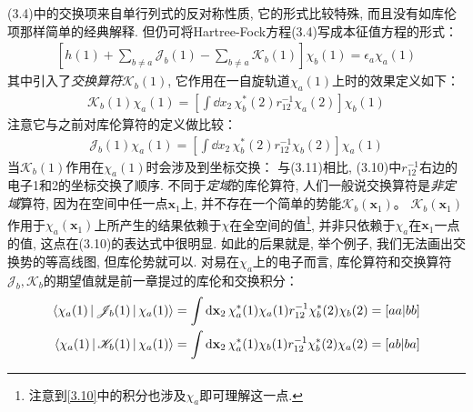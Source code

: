 (3.4)中的交换项来自单行列式的反对称性质, 它的形式比较特殊, 而且没有如库伦项那样简单的经典解释. 
但仍可将Hartree-Fock方程(3.4)写成本征值方程的形式：
\begin{align}
	\left[ h(1) + \sum_{b\neq a}\mathscr{J}_b(1) - \sum_{b\neq a}\mathscr{K}_b(1)   \right]\chi_b(1) = \epsilon_a\chi_a(1)
\end{align}
其中引入了\emph{交换算符}$\mathscr{K}_b(1)$, 
它作用在一自旋轨道$\chi_a(1)$上时的效果定义如下：
\begin{align}
	\label{3.10}
	\mathscr{K}_b(1)\chi_a(1) = \left[ \int\dd{x}_2\,\chi_b^*(2)r_{12}^{-1}\chi_a(2) \right]\chi_b(1)
\end{align}
注意它与之前对库伦算符的定义做比较：
\begin{align}
	\label{3.11}
	\mathscr{J}_b(1)\chi_a(1) = \left[ \int\dd{x}_2\,\chi_b^*(2)r_{12}^{-1}\chi_b(2) \right]\chi_a(1)
\end{align}
当$\mathscr{K}_b(1)$作用在$\chi_a(1)$时会涉及到坐标交换：
与(3.11)相比, (3.10)中$r_{12}^{-1}$右边的电子1和2的坐标交换了顺序. 
不同于\emph{定域}的库伦算符, 人们一般说交换算符是\emph{非定域}算符, 
因为在空间中任一点$\mathbf{x}_1$上, 并不存在一个简单的势能$\mathscr{K}_b(\mathbf{x}_1)$。 $\mathscr{K}_b(\mathbf{x}_1)$作用于$\chi_a(\mathbf{x}_1)$上所产生的结果依赖于$\chi$在全空间的值\footnote{
	注意到\autoref{3.10}中的积分也涉及$\chi_a$即可理解这一点.
}, 
并非只依赖于$\chi_a$在$\mathbf{x}_1$一点的值, 这点在(3.10)的表达式中很明显. 
如此的后果就是, 举个例子, 我们无法画出交换势的等高线图, 但库伦势就可以. 
对易在$\chi_a$上的电子而言, 库伦算符和交换算符$\mathscr{J}_b,\mathscr{K}_b$的期望值就是前一章提过的库伦和交换积分：
\begin{align}
	\braket{\chi_a(1)|\mathscr{J}_b(1)|\chi_a(1)} & = \int\dd{x}_2\,\chi_a^*(1)\chi_a(1)r_{12}^{-1}\chi_b^*(2)\chi_b(2) = [aa|bb]\\
	\braket{\chi_a(1)|\mathscr{K}_b(1)|\chi_a(1)} & = \int\dd{x}_2\,\chi_a^*(1)\chi_b(1)r_{12}^{-1}\chi_b^*(2)\chi_a(2) = [ab|ba]
\end{align}

